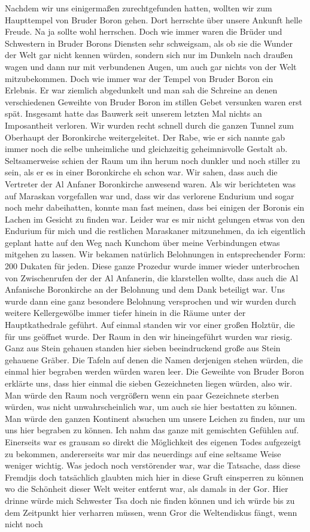Nachdem wir uns einigermaßen zurechtgefunden hatten, wollten wir zum Haupttempel von Bruder Boron gehen. Dort herrschte über unsere Ankunft helle Freude. Na ja sollte wohl herrschen. Doch wie immer waren die Brüder und Schwestern in Bruder Borons Diensten sehr schweigsam, als ob sie die Wunder der Welt gar nicht kennen würden, sondern sich nur im Dunkeln nach draußen wagen und dann nur mit verbundenen Augen, um auch gar nichts von der Welt mitzubekommen. Doch wie immer war der Tempel von Bruder Boron ein Erlebnis. Er war ziemlich abgedunkelt und man sah die Schreine an denen verschiedenen Geweihte von Bruder Boron im stillen Gebet versunken waren erst spät. Insgesamt hatte das Bauwerk seit unserem letzten Mal nichts an Imposantheit verloren. Wir wurden recht schnell durch die ganzen Tunnel zum Oberhaupt der Boronkirche weitergeleitet. Der Rabe, wie er sich nannte gab immer noch die selbe unheimliche und gleichzeitig geheimnisvolle Gestalt ab. Seltsamerweise schien der Raum um ihn herum noch dunkler und noch stiller zu sein, als er es in einer Boronkirche eh schon war. Wir sahen, dass auch die Vertreter der Al Anfaner Boronkirche anwesend waren. Als wir berichteten was auf Maraskan vorgefallen war und, dass wir das verlorene Endurium und sogar noch mehr dabeihatten, konnte man fast meinen, dass bei einigen der Boronis ein Lachen im Gesicht zu finden war. Leider war es mir nicht gelungen etwas von den Endurium für mich und die restlichen Maraskaner mitzunehmen, da ich eigentlich geplant hatte auf den Weg nach Kunchom über meine Verbindungen etwas mitgehen zu lassen. Wir bekamen natürlich Belohnungen in entsprechender Form: 200 Dukaten für jeden. Diese ganze Prozedur wurde immer wieder unterbrochen von Zwischenrufen der der Al Anfanerin, die klarstellen wollte, dass auch die Al Anfanische Boronkirche an der Belohnung und dem Dank beteiligt war. Uns wurde dann eine ganz besondere Belohnung versprochen und wir wurden durch weitere Kellergewölbe immer tiefer hinein in die Räume unter der Hauptkathedrale geführt. Auf einmal standen wir vor einer großen Holztür, die für uns geöffnet wurde. Der Raum in den wir hineingeführt wurden war riesig. Ganz aus Stein gehauen standen hier sieben beeindruckend große aus Stein gehauene Gräber. Die Tafeln auf denen die Namen derjenigen stehen würden, die einmal hier begraben werden würden waren leer. Die Geweihte von Bruder Boron erklärte uns, dass hier einmal die sieben Gezeichneten liegen würden, also wir. Man würde den Raum noch vergrößern wenn ein paar Gezeichnete sterben würden, was nicht unwahrscheinlich war, um auch sie hier bestatten zu können. Man würde den ganzen Kontinent absuchen um unsere Leichen zu finden, nur um uns hier begraben zu können. Ich nahm das ganze mit gemischten Gefühlen auf. Einerseits war es grausam so direkt die Möglichkeit des eigenen Todes aufgezeigt zu bekommen, andererseits war mir das neuerdings auf eine seltsame Weise weniger wichtig. Was jedoch noch verstörender war, war die Tatsache, dass diese Fremdjis doch tatsächlich glaubten mich hier in diese Gruft einsperren zu können wo die Schönheit dieser Welt weiter entfernt war, als damals in der Gor. Hier drinne würde mich Schwester Tsa doch nie finden können und ich würde bis zu dem Zeitpunkt hier verharren müssen, wenn Gror die Weltendiskus fängt, wenn nicht noch 